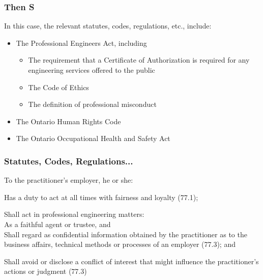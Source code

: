 \begin{frame}
\frametitle{Then S}

In this case, the relevant statutes, codes, regulations, etc., include:
\begin{itemize}
	\item The Professional Engineers Act, including
	\begin{itemize}
		\item The requirement that a Certificate of Authorization is required for any engineering services offered to the public
		\item The Code of Ethics
		\item The definition of professional misconduct
	\end{itemize}
	\item The Ontario Human Rights Code
	\item The Ontario Occupational Health and Safety Act
\end{itemize}

\end{frame}



\begin{frame}
\frametitle{Statutes, Codes, Regulations...}

To the practitioner's employer, he or she:

Has a duty to act at all times with fairness and loyalty (77.1);

Shall act in professional engineering matters:\\
\quad As a faithful agent or trustee, and\\
\quad Shall regard as confidential information obtained by the practitioner as to the business affairs, technical methods or processes of an employer (77.3); and


Shall avoid or disclose a conflict of interest that might influence the practitioner's actions or judgment (77.3)


\end{frame}



